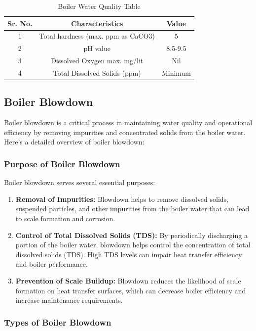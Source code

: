\begin{table}[h]
\centering
\begin{tabular}{|c|c|c|}
\hline
\textbf{Sr. No.} & \textbf{Characteristics} & \textbf{Value} \\
\hline
1 & Total hardness (max. ppm as CaCO3) & 5 \\
\hline
2 & pH value & 8.5-9.5 \\
\hline
3 & Dissolved Oxygen max. mg/lit & Nil \\
\hline
4 & Total Dissolved Solids (ppm) & Minimum \\
\hline
\end{tabular}
\caption{Boiler Water Quality Table}
\label{tab:boiler-water-quality}
\end{table}

\subsection{Boiler Blowdown}

Boiler blowdown is a critical process in maintaining water quality and operational efficiency by removing impurities and concentrated solids from the boiler water. Here's a detailed overview of boiler blowdown:

\subsubsection{Purpose of Boiler Blowdown}

Boiler blowdown serves several essential purposes:
\begin{enumerate}
    \item \textbf{Removal of Impurities:} Blowdown helps to remove dissolved solids, suspended particles, and other impurities from the boiler water that can lead to scale formation and corrosion.
    \item \textbf{Control of Total Dissolved Solids (TDS):} By periodically discharging a portion of the boiler water, blowdown helps control the concentration of total dissolved solids (TDS). High TDS levels can impair heat transfer efficiency and boiler performance.
    \item \textbf{Prevention of Scale Buildup:} Blowdown reduces the likelihood of scale formation on heat transfer surfaces, which can decrease boiler efficiency and increase maintenance requirements.
\end{enumerate}

\subsubsection{Types of Boiler Blowdown}

